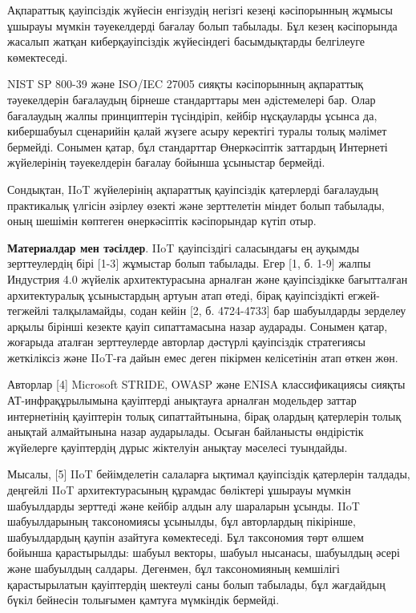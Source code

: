 Ақпараттық қауіпсіздік жүйесін енгізудің негізгі кезеңі кәсіпорынның
жұмысы ұшырауы мүмкін тәуекелдерді бағалау болып табылады. Бұл кезең
кәсіпорында жасалып жатқан киберқауіпсіздік жүйесіндегі басымдықтарды
белгілеуге көмектеседі.

NIST SP 800-39 және ISO/IEC 27005 сияқты кәсіпорынның ақпараттық
тәуекелдерін бағалаудың бірнеше стандарттары мен әдістемелері бар. Олар
бағалаудың жалпы принциптерін түсіндіріп, кейбір нұсқауларды ұсынса да,
кибершабуыл сценарийін қалай жүзеге асыру керектігі туралы толық мәлімет
бермейді. Сонымен қатар, бұл стандарттар Өнеркәсіптік заттардың
Интернеті жүйелерінің тәуекелдерін бағалау бойынша ұсыныстар бермейді.

Сондықтан, IIoT жүйелерінің ақпараттық қауіпсіздік қатерлерді бағалаудың
практикалық үлгісін әзірлеу өзекті және зерттелетін міндет болып
табылады, оның шешімін көптеген өнеркәсіптік кәсіпорындар күтіп отыр.

{\bfseries Материалдар мен тәсілдер}. IIoT қауіпсіздігі саласындағы ең
ауқымды зерттеулердің бірі {[}1-3{]} жұмыстар болып табылады. Егер {[}1,
б. 1-9{]} жалпы Индустрия 4.0 жүйелік архитектурасына арналған және
қауіпсіздікке бағытталған архитектуралық ұсыныстардың артуын атап өтеді,
бірақ қауіпсіздікті егжей-тегжейлі талқыламайды, содан кейін {[}2, б.
4724-4733{]} бар шабуылдарды зерделеу арқылы бірінші кезекте қауіп
сипаттамасына назар аударады. Сонымен қатар, жоғарыда аталған
зерттеулерде авторлар дәстүрлі қауіпсіздік стратегиясы жеткіліксіз және
IIoT-ға дайын емес деген пікірмен келісетінін атап өткен жөн.

Авторлар {[}4{]} Microsoft STRIDE, OWASP және ENISA классификациясы
сияқты АТ-инфрақұрылымына қауіптерді анықтауға арналған модельдер заттар
интернетінің қауіптерін толық сипаттайтынына, бірақ олардың қатерлерін
толық анықтай алмайтынына назар аударылады. Осыған байланысты өндірістік
жүйелерге қауіптердің дұрыс жіктелуін анықтау мәселесі туындайды.

Мысалы, {[}5{]} IIoT бейімделетін салаларға ықтимал қауіпсіздік
қатерлерін талдады, деңгейлі IIoT архитектурасының құрамдас бөліктері
ұшырауы мүмкін шабуылдарды зерттеді және кейбір алдын алу шараларын
ұсынды. IIoT шабуылдарының таксономиясы ұсынылды, бұл авторлардың
пікірінше, шабуылдардың қаупін азайтуға көмектеседі. Бұл таксономия төрт
өлшем бойынша қарастырылды: шабуыл векторы, шабуыл нысанасы, шабуылдың
әсері және шабуылдың салдары. Дегенмен, бұл таксономияның кемшілігі
қарастырылатын қауіптердің шектеулі саны болып табылады, бұл жағдайдың
бүкіл бейнесін толығымен қамтуға мүмкіндік бермейді.

